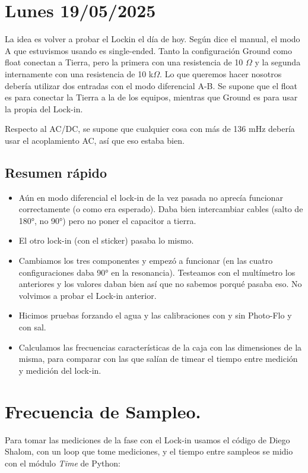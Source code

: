 
\section{Lunes 19/05/2025}
La idea es volver a probar el Lockin el día de hoy. Según dice el manual, el modo A que estuvismos usando es single-ended. Tanto la configuración Ground como float conectan a Tierra, pero la primera con una resistencia de 10 $\Omega$ y la segunda internamente con una resistencia de 10 k$\Omega$. Lo que queremos hacer nosotros debería utilizar dos entradas con el modo diferencial A-B. Se supone que el float es para conectar la Tierra a la de los equipos, mientras que Ground es para usar la propia del Lock-in. 

Respecto al AC/DC, se supone que cualquier cosa con más de 136 mHz debería usar el acoplamiento AC, así que eso estaba bien.

\subsection*{Resumen rápido}
\begin{itemize}
	\item Aún en modo diferencial el lock-in de la vez pasada no aprecía funcionar correctamente (o como era esperado). Daba bien intercambiar cables (salto de 180°, no 90°) pero no poner el capacitor a tierra.
	\item El otro lock-in (con el sticker) pasaba lo mismo. 
	\item Cambiamos los tres componentes y empezó a funcionar (en las cuatro configuraciones daba 90° en la resonancia). Testeamos con el multímetro los anteriores y los valores daban bien así que no sabemos porqué pasaba eso. No volvimos a probar el Lock-in anterior.
	\item Hicimos pruebas forzando el agua y las calibraciones con y sin Photo-Flo y con sal. 
	\item Calculamos las frecuencias características de la caja con las dimensiones de la misma, para comparar con las que salían de timear el tiempo entre medición y medición del lock-in. %
\end{itemize}

\section{Frecuencia de Sampleo.}
Para tomar las mediciones de la fase con el Lock-in usamos el código de Diego Shalom, con un loop que tome mediciones, y el tiempo entre sampleos se midio con el módulo \textit{Time} de Python:

